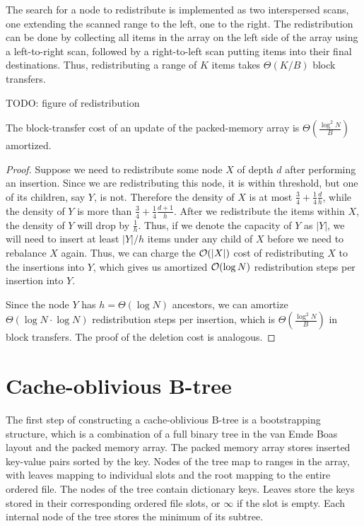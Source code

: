 The search for a node to redistribute is implemented as two interspersed scans,
one extending the scanned range to the left, one to the right. The
redistribution can be done by collecting all items in the array on the left side
of the array using a left-to-right scan, followed by a right-to-left scan
putting items into their final destinations. Thus,
redistributing a range of $K$ items takes $\Theta(K/B)$ block transfers.

TODO: figure of redistribution

\begin{theorem}
The block-transfer cost of an update of the packed-memory array
is $\Theta(\frac{\log^2 N}{B})$ amortized.
\end{theorem}

\begin{proof}
Suppose we need to redistribute some node $X$ of depth $d$ after performing
an insertion. Since we are redistributing this node, it is within threshold,
but one of its children, say $Y$, is not.
Therefore the density of $X$ is at most
$\frac{3}{4}+\frac{1}{4}\frac{d}{h}$, while the density of $Y$ is more than
$\frac{3}{4}+\frac{1}{4}\frac{d+1}{h}$. After we redistribute the items within $X$,
the density of $Y$ will drop by $\frac{1}{h}$. Thus, if we denote the capacity
of $Y$ as $|Y|$, we will need to insert at least $|Y|/h$ items under any
child of $X$ before we need to rebalance $X$ again.
Thus, we can charge the $\mathcal{O}(|X|)$ cost of redistributing $X$ to the
insertions into $Y$, which gives us amortized $\mathcal{O}(\log N)$
redistribution steps per insertion into $Y$.

Since the node $Y$ has $h=\Theta(\log N)$ ancestors, we can amortize
$\Theta(\log N \cdot \log N)$ redistribution steps per insertion, which is
$\Theta(\frac{\log^2 N}{B})$ in block transfers. The proof of the deletion
cost is analogous.
\end{proof}

\section{Cache-oblivious B-tree}
The first step of constructing a cache-oblivious B-tree is a bootstrapping
structure, which is a combination of a full binary tree in
the van Emde Boas layout and the packed memory array.
The packed memory array stores inserted key-value pairs sorted by the key.
Nodes of the tree map to ranges in the array, with leaves mapping
to individual slots and the root mapping to the entire ordered file.
The nodes of the tree contain dictionary keys.
Leaves store the keys stored in their corresponding ordered file slots,
or $\infty$ if the slot is empty. Each internal node of the tree
stores the minimum of its subtree.

